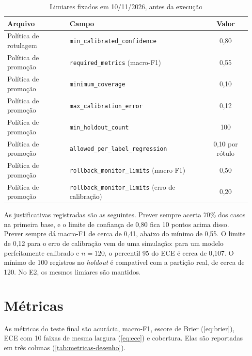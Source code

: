 \begin{table}[htb]
  \centering
  \caption{Limiares fixados em 10/11/2026, antes da execução}
  \label{tab:limiares}
  \small
  \begin{tabular}{llc}
    \toprule
    Arquivo & Campo & Valor \\
    \midrule
    Política de rotulagem & \texttt{min\_calibrated\_confidence} & 0,80 \\
    Política de promoção & \texttt{required\_metrics} (macro-F1) & 0,55 \\
    Política de promoção & \texttt{minimum\_coverage} & 0,10 \\
    Política de promoção & \texttt{max\_calibration\_error} & 0,12 \\
    Política de promoção & \texttt{min\_holdout\_count} & 100 \\
    Política de promoção & \texttt{allowed\_per\_label\_regression} & 0,10 por rótulo \\
    Política de promoção & \texttt{rollback\_monitor\_limits} (macro-F1) & 0,50 \\
    Política de promoção & \texttt{rollback\_monitor\_limits} (erro de calibração) & 0,20 \\
    \bottomrule
  \end{tabular}
\end{table}

As justificativas registradas são as seguintes. Prever sempre  acerta 70\% dos casos na primeira base, e o limite de confiança de 0{,}80 fica 10 pontos acima disso. Prever sempre  dá macro-F1 de cerca de 0{,}41, abaixo do mínimo de 0{,}55. O limite de 0{,}12 para o erro de calibração vem de uma simulação: para um modelo perfeitamente calibrado e $n=120$, o percentil 95 do ECE é cerca de 0{,}107. O mínimo de 100 registros no \emph{holdout} é compatível com a partição real, de cerca de 120. No E2, os mesmos limiares são mantidos.

\section{Métricas}
\label{sec:metricas}

As métricas do teste final são acurácia, macro-F1, escore de Brier (\autoref{eq:brier}), ECE com 10 faixas de mesma largura (\autoref{eq:ece}) e cobertura. Elas são reportadas em três colunas (\autoref{tab:metricas-desenho}).

